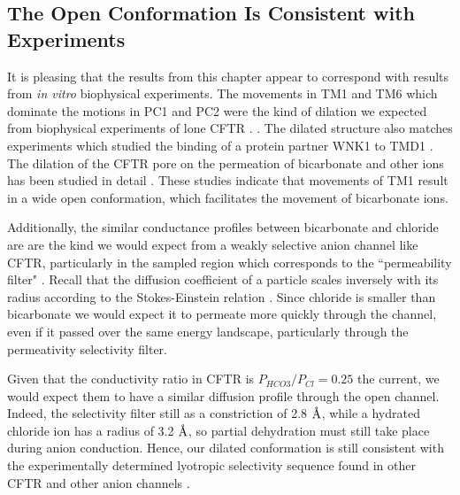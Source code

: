 

\subsection{The Open Conformation Is Consistent with Experiments}
It is pleasing that the results from this chapter appear to correspond with results from \textit{in vitro} biophysical experiments. The movements in TM1 and TM6 which dominate the motions in PC1 and PC2 were the kind of dilation we expected from biophysical experiments of lone CFTR \cite{negoda2018}. \cite{negoda2019,linsdell2016}. The dilated structure also matches experiments which studied the binding of a protein partner WNK1 to TMD1 \cite{kim2019}. The dilation of the CFTR pore on the permeation of bicarbonate and other ions has been studied in detail \cite{jun2016, kim2019}. These studies indicate that movements of TM1 result in a wide open conformation, which facilitates the movement of bicarbonate ions.  

Additionally, the similar conductance profiles between bicarbonate and chloride are are the kind we would expect from a weakly selective anion channel like CFTR, particularly in the sampled region which corresponds to the ``permeability filter" \cite{linsdell2016}. Recall that the diffusion coefficient of a particle scales inversely with its radius according to the Stokes-Einstein relation \cite{miller1924}. Since chloride is smaller than bicarbonate we would expect it to permeate more quickly through the channel, even if it passed over the same energy landscape, particularly through the permeativity selectivity filter. 

Given that the conductivity ratio in CFTR is $P_{HCO3}/P_{Cl}=0.25$ the current, we would expect them to have a similar diffusion profile through the open channel. Indeed, the selectivity filter still as a constriction of 2.8 $\textup{\AA}$, while a hydrated chloride ion has a radius of 3.2 $\textup{\AA}$, so partial dehydration must still take place during anion conduction. Hence, our dilated conformation is still consistent with the experimentally determined lyotropic selectivity sequence found in other CFTR and other anion channels \cite{linsdell2016}. 

